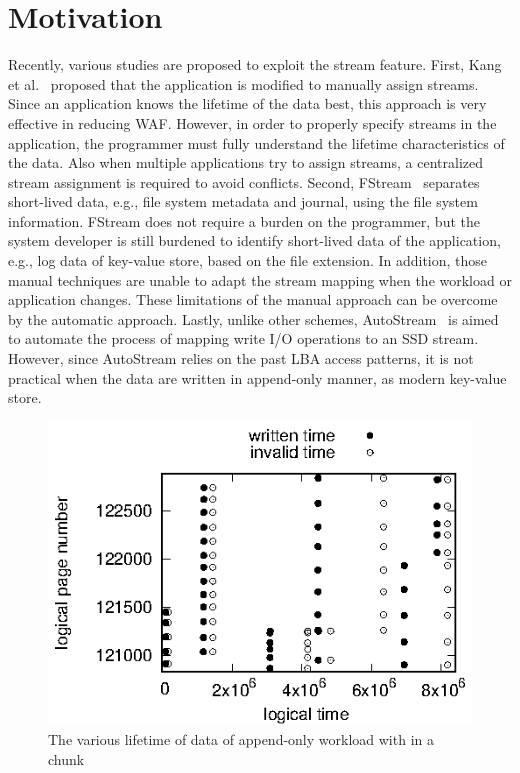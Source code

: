 \section{Motivation}
Recently, various studies are proposed to exploit the stream feature.
First, Kang et al.~\cite{MultiStream} proposed that the application
is modified to manually assign streams.
Since an application knows the lifetime of the data best, this approach
is very effective in reducing WAF.
However, in order to properly specify streams in the application, the programmer must
fully understand the lifetime characteristics of the data.
Also when multiple applications try to assign streams, a centralized stream assignment
is required to avoid conflicts.
Second, FStream~\cite{FStream} separates short-lived data, e.g., file system metadata and
journal, using the file system information. 
FStream does not require a burden on the programmer, but the system developer is still burdened
to identify short-lived data of the application, e.g., log data of key-value store, based on the file extension.
In addition, those manual techniques are unable to adapt the stream mapping when the workload or application changes.
These limitations of the manual approach can be overcome by the automatic approach.
Lastly, unlike other schemes, AutoStream~\cite{AutoStream} is aimed to automate the process of mapping 
write I/O operations to an SSD stream.
However, since AutoStream relies on the past LBA access patterns, it is not practical when the data are written in
append-only manner, as modern key-value store.

\begin{figure}[!b]
	\vspace{-25pt}
	\centering
	\includegraphics[width=0.9\linewidth]{figure/chunklifetime} %
	\vspace{-10pt}
	\caption{The various lifetime of data of append-only workload with in a chunk}
	\label{fig:chunklifetime}
\end{figure}

